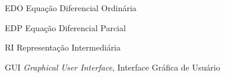 \documentclass[
	12pt,				%
	openright,			%
	oneside,			%
	a4paper,			%
	main=brazil,
	english,			%
	]{ufsj-abntex2}
\begin{document}
\begin{siglas}
  \item[EDO] Equação Diferencial Ordinária
  \item[EDP] Equação Diferencial Parcial
  \item[RI] Representação Intermediária
  \item[GUI] \textit{Graphical User Interface}, Interface Gráfica de Usuário
\end{siglas}


\tableofcontents*
\cleardoublepage


\textual
\end{document}
